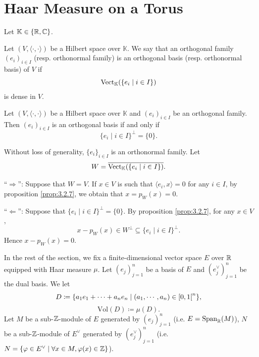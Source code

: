 \section{Haar Measure on a Torus}
Let $\mathbb{K} \in \{\mathbb{R},\mathbb{C}\}$.

\begin{definitionenv}
    Let $(V,\langle \cdot,\cdot \rangle)$ be a Hilbert space over $\mathbb{K}$.
    We say that an orthogonal family $(e_i)_{i \in I}$ (resp. orthonormal family) is an orthogonal basis (resp. orthonormal basis) of $V$ if
    $$\operatorname{\mathrm{Vect}}_{\mathbb{K}}(\{e_i \mid i \in I\})$$
    is dense in $V$.
\end{definitionenv}

\begin{propositionenv}
    Let $(V,\langle \cdot,\cdot \rangle)$ be a Hilbert space over $\mathbb{K}$ and $(e_i)_{i \in I}$ be an orthogonal family.
    Then $(e_i)_{i \in I}$ is an orthogonal basis if and only if
    $$\{e_i \mid i \in I\}^\perp = \{0\}.$$
\end{propositionenv}
\begin{proofenv}
    Without loss of generality, $\{e_i\}_{i \in I}$ is an orthonormal family.
    Let
    $$W = \overline{\operatorname{\mathrm{Vect}}_{\mathbb{K}}(\{e_i \mid i \in I\})}.$$

    ``$\Rightarrow$'': Suppose that $W = V$.
    If $x \in V$ is such that $\langle e_i,x \rangle = 0$ for any $i \in I$, by proposition \ref{prop:3.2.7}, we obtain that $x = p_{W}(x) = 0$.

    ``$\Leftarrow$'': Suppose that $\{e_i \mid i \in I\}^{\perp} = \{0\}$.
    By proposition \ref{prop:3.2.7}, for any $x \in V$,
    $$x - p_W(x) \in W^\perp \subseteq \{e_i \mid i \in I\}^\perp.$$
    Hence $x - p_{W}(x) = 0$.
\end{proofenv}

In the rest of the section, we fix a finite-dimensional vector space $E$ over $\mathbb{R}$ equipped with Haar measure $\mu$.
Let $(e_j)_{j=1}^n$ be a basis of $E$ and $(e^\vee_{j})_{j=1}^{n}$ be the dual basis.
We let
$$D \coloneq \{a_1 e_1 + \cdots + a_n e_n \mid (a_1,\cdots,a_n) \in \interval[open right]{0}{1}^n\},$$
$$\mathrm{Vol}(D) \coloneq \mu(D).$$
Let $M$ be a sub-$\mathbb{Z}$-module of $E$ generated by $(e_j)_{j=1}^n$ (i.e. $E = \operatorname{\mathrm{Span}}_{\mathbb{R}}(M)$), $N$ be a sub-$\mathbb{Z}$-module of $E^\vee$ generated by $(e^\vee_j)_{j=1}^{n}$ (i.e. $N = \{\varphi \in E^\vee \mid \forall x \in M, \varphi(x) \in \mathbb{Z}\}$).

